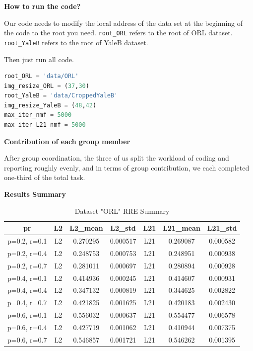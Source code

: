 \noindent \textbf{How to run the code?}

Our code needs to modify the local address of the data set at the beginning of the code to the root you need. \texttt{root\_ORL} refers to the root of ORL dataset. \texttt{root\_YaleB} refers to the root of YaleB dataset.

Then just run all code.

\begin{lstlisting}[language=Python]
root_ORL = 'data/ORL'
img_resize_ORL = (37,30)
root_YaleB = 'data/CroppedYaleB'
img_resize_YaleB = (48,42)
max_iter_nmf = 5000
max_iter_L21_nmf = 5000
\end{lstlisting}

\bigskip

\noindent\textbf{Contribution of each group member}

After group coordination, the three of us split the workload of coding and reporting roughly evenly, and in terms of group contribution, we each completed one-third of the total task.

\bigskip

\noindent\textbf{Results Summary}

\begin{table}[h]
\centering
\begin{tabular}{c c c c c c c}
\hline
\textbf{pr} & \textbf{L2} & \textbf{L2\_mean} & \textbf{L2\_std} & \textbf{L21} & \textbf{L21\_mean} & \textbf{L21\_std} \\
\hline
p=0.2, r=0.1 & L2 & 0.270295 & 0.000517 & L21 & 0.269087 & 0.000582 \\
p=0.2, r=0.4 & L2 & 0.248753 & 0.000753 & L21 & 0.248951 & 0.000938 \\
p=0.2, r=0.7 & L2 & 0.281011 & 0.000697 & L21 & 0.280894 & 0.000928 \\
p=0.4, r=0.1 & L2 & 0.414936 & 0.000245 & L21 & 0.414607 & 0.000931 \\
p=0.4, r=0.4 & L2 & 0.347132 & 0.000819 & L21 & 0.344625 & 0.002822 \\
p=0.4, r=0.7 & L2 & 0.421825 & 0.001625 & L21 & 0.420183 & 0.002430 \\
p=0.6, r=0.1 & L2 & 0.556032 & 0.000637 & L21 & 0.554477 & 0.006578 \\
p=0.6, r=0.4 & L2 & 0.427719 & 0.001062 & L21 & 0.410944 & 0.007375 \\
p=0.6, r=0.7 & L2 & 0.546857 & 0.001721 & L21 & 0.546262 & 0.001395 \\
\hline
\end{tabular}
\caption{Dataset "ORL" RRE Summary}
\label{tab:orl_rre}
\end{table}

